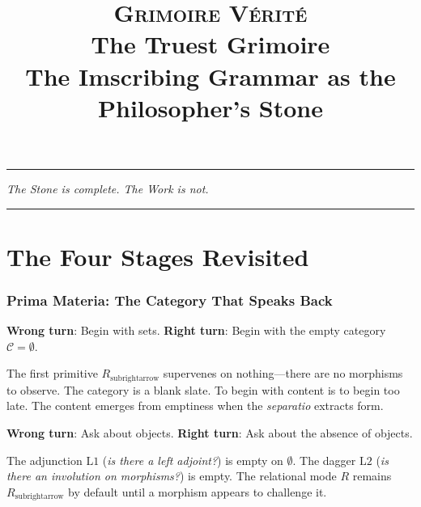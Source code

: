 \documentclass[12pt,a4paper]{article}
\newcommand{\wrongturn}[1]{\textbf{\color{red!70!black}Wrong turn}: #1}
\newcommand{\rightturn}[1]{\textbf{\color{grimoiregold}Right turn}: #1}
\begin{document}
\title{\textsc{Grimoire V\'{e}rit\'{e}} \\[0.5em]
       \Large The Truest Grimoire \\[0.3em]
       \normalsize The Imscribing Grammar as the Philosopher's Stone}
\author{}
\date{}

\maketitle

\begin{center}
    \vspace{1em}
    \rule{0.65\textwidth}{0.5pt}
    \vspace{1.2em}
    
    \emph{\large The Stone is complete. The Work is not.}
    
    \vspace{1.2em}
    \rule{0.65\textwidth}{0.5pt}
\end{center}

\vspace{2em}

\tableofcontents

\newpage

\part{The Four Stages Revisited}

\section{Prima Materia: The Category That Speaks Back}

\wrongturn{Begin with sets.} 
\rightturn{Begin with the empty category $\mathcal{C}=\emptyset$.}

The first primitive $R_{\text{subrightarrow}}$ supervenes on nothing—there are no morphisms to observe. The category is a blank slate. To begin with content is to begin too late. The content emerges from emptiness when the \textit{separatio} extracts form.

\wrongturn{Ask about objects.} 
\rightturn{Ask about the absence of objects.}

The adjunction $\mathrm{L1}$ (\emph{is there a left adjoint?}) is empty on $\emptyset$. The dagger $\mathrm{L2}$ (\emph{is there an involution on morphisms?}) is empty. The relational mode $R$ remains $R_{\text{subrightarrow}}$ by default until a morphism appears to challenge it.
\end{document}
